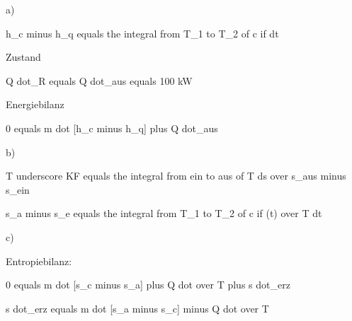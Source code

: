 a) 

h_c minus h_q equals the integral from T_1 to T_2 of c if dt

Zustand

Q dot_R equals Q dot_aus equals 100 kW

Energiebilanz

0 equals m dot [h_c minus h_q] plus Q dot_aus

b) 

T underscore KF equals the integral from ein to aus of T ds over s_aus minus s_ein

s_a minus s_e equals the integral from T_1 to T_2 of c if (t) over T dt

c) 

Entropiebilanz:

0 equals m dot [s_c minus s_a] plus Q dot over T plus s dot_erz

s dot_erz equals m dot [s_a minus s_c] minus Q dot over T